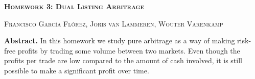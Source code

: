 \documentclass[8 pt]{article}
\begin{document}
\begin{minipage}{\textwidth}
    \centering
    \Large \textbf{\textsc{Homework 3: Dual Listing Arbitrage}}
    \vspace{0.5cm}

    \small \textsc{Francisco García Flórez, Joris van Lammeren, Wouter Varenkamp}
    \vspace{0.5cm}

    \begin{minipage}{0.6\textwidth}
      \textbf{Abstract.} In this homework we study pure arbitrage as a way of making risk-free profits by trading some volume between two markets. Even though the profits per trade are low compared to the amount of cash involved, it is still possible to make a significant profit over time.
    \end{minipage}
\end{minipage}

\vspace{0.5cm}
\end{document}
